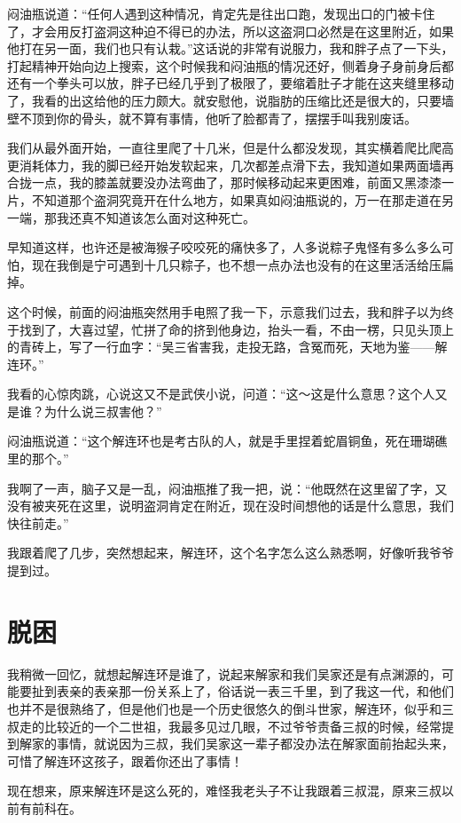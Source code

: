闷油瓶说道：“任何人遇到这种情况，肯定先是往出口跑，发现出口的门被卡住了，才会用反打盗洞这种迫不得已的办法，所以这盗洞口必然是在这里附近，如果他打在另一面，我们也只有认栽。”这话说的非常有说服力，我和胖子点了一下头，打起精神开始向边上搜索，这个时候我和闷油瓶的情况还好，侧着身子身前身后都还有一个拳头可以放，胖子已经几乎到了极限了，要缩着肚子才能在这夹缝里移动了，我看的出这给他的压力颇大。就安慰他，说脂肪的压缩比还是很大的，只要墙壁不顶到你的骨头，就不算有事情，他听了脸都青了，摆摆手叫我别废话。

我们从最外面开始，一直往里爬了十几米，但是什么都没发现，其实横着爬比爬高更消耗体力，我的脚已经开始发软起来，几次都差点滑下去，我知道如果两面墙再合拢一点，我的膝盖就要没办法弯曲了，那时候移动起来更困难，前面又黑漆漆一片，不知道那个盗洞究竟开在什么地方，如果真如闷油瓶说的，万一在那走道在另一端，那我还真不知道该怎么面对这种死亡。

早知道这样，也许还是被海猴子咬咬死的痛快多了，人多说粽子鬼怪有多么多么可怕，现在我倒是宁可遇到十几只粽子，也不想一点办法也没有的在这里活活给压扁掉。

这个时候，前面的闷油瓶突然用手电照了我一下，示意我们过去，我和胖子以为终于找到了，大喜过望，忙拼了命的挤到他身边，抬头一看，不由一楞，只见头顶上的青砖上，写了一行血字：“吴三省害我，走投无路，含冤而死，天地为鉴——解连环。”

我看的心惊肉跳，心说这又不是武侠小说，问道：“这～这是什么意思？这个人又是谁？为什么说三叔害他？”

闷油瓶说道：“这个解连环也是考古队的人，就是手里捏着蛇眉铜鱼，死在珊瑚礁里的那个。”

我啊了一声，脑子又是一乱，闷油瓶推了我一把，说：“他既然在这里留了字，又没有被夹死在这里，说明盗洞肯定在附近，现在没时间想他的话是什么意思，我们快往前走。”

我跟着爬了几步，突然想起来，解连环，这个名字怎么这么熟悉啊，好像听我爷爷提到过。

\chapter{脱困}

我稍微一回忆，就想起解连环是谁了，说起来解家和我们吴家还是有点渊源的，可能要扯到表亲的表亲那一份关系上了，俗话说一表三千里，到了我这一代，和他们也并不是很熟络了，但是他们也是一个历史很悠久的倒斗世家，解连环，似乎和三叔走的比较近的一个二世祖，我最多见过几眼，不过爷爷责备三叔的时候，经常提到解家的事情，就说因为三叔，我们吴家这一辈子都没办法在解家面前抬起头来，可惜了解连环这孩子，跟着你还出了事情！

现在想来，原来解连环是这么死的，难怪我老头子不让我跟着三叔混，原来三叔以前有前科在。

